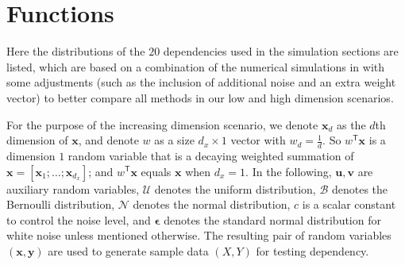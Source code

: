 \documentclass[11pt]{article}
\newcommand{\T}{^{\ensuremath{\mathsf{T}}}}           %
\providecommand{\mb}[1]{\boldsymbol{#1}}
\providecommand{\mc}[1]{\mathcal{#1}}
\begin{document}
\section{Functions}
\label{appen:function}

Here the distributions of the $20$ dependencies used in the simulation sections are listed, which are based on a combination of the numerical simulations in \cite{SzekelyRizzoBakirov2007, SimonTibshirani2012, SimonTibshirani2012, GorfineHellerHeller2012} with some adjustments (such as the inclusion of additional noise and an extra weight vector) to better compare all methods in our low and high dimension scenarios.

For the purpose of the increasing dimension scenario, we denote $\mb{x}_{d}$ as the $d$th dimension of $\mb{x}$, and denote $w$ as a size $d_{x} \times 1$ vector with $w_{d}=\frac{1}{d}$. So $w\T \mb{x}$ is a dimension $1$ random variable that is a decaying weighted summation of $\mb{x}=[\mb{x}_{1};\ldots;\mb{x}_{d_{x}}]$; and $w\T \mb{x}$ equals $\mb{x}$ when $d_{x}=1$. In the following, $\mb{u}, \mb{v}$ are auxiliary random variables, $\mc{U}$ denotes the uniform distribution, $\mc{B}$ denotes the Bernoulli distribution, $\mc{N}$ denotes the normal distribution, $c$ is a scalar constant to control the noise level, and $\mb{\epsilon}$ denotes the standard normal distribution for white noise unless mentioned otherwise. The resulting pair of random variables $(\mb{x},\mb{y})$ are used to generate sample data $(X,Y)$ for testing dependency.
\end{document}
